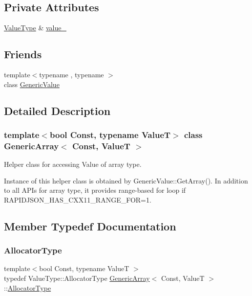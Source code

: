 \subsection*{Private Attributes}
\begin{DoxyCompactItemize}
\item 
\hyperlink{classGenericArray_a93e53f38a99fc5167eb2a28653de64ed}{Value\+Type} \& \hyperlink{classGenericArray_afac7de0d842f341d32a36919fd17cad5}{value\+\_\+}
\end{DoxyCompactItemize}
\subsection*{Friends}
\begin{DoxyCompactItemize}
\item 
{\footnotesize template$<$typename , typename $>$ }\\class \hyperlink{classGenericArray_a899449e1a645b5e377af059fb61113d8}{Generic\+Value}
\end{DoxyCompactItemize}


\subsection{Detailed Description}
\subsubsection*{template$<$bool Const, typename ValueT$>$\newline
class Generic\+Array$<$ Const, Value\+T $>$}

Helper class for accessing Value of array type. 

Instance of this helper class is obtained by {\ttfamily Generic\+Value\+::\+Get\+Array()}. In addition to all A\+P\+Is for array type, it provides range-\/based for loop if {\ttfamily R\+A\+P\+I\+D\+J\+S\+O\+N\+\_\+\+H\+A\+S\+\_\+\+C\+X\+X11\+\_\+\+R\+A\+N\+G\+E\+\_\+\+F\+OR=1}. 

\subsection{Member Typedef Documentation}
\mbox{\label{classGenericArray_af9cdc12de03c742b9c33dfc172756b97}} 
\subsubsection{\texorpdfstring{Allocator\+Type}{AllocatorType}}
{\footnotesize\ttfamily template$<$bool Const, typename ValueT $>$ \\
typedef Value\+Type\+::\+Allocator\+Type \hyperlink{classGenericArray}{Generic\+Array}$<$ Const, ValueT $>$\+::\hyperlink{classGenericArray_af9cdc12de03c742b9c33dfc172756b97}{Allocator\+Type}}

